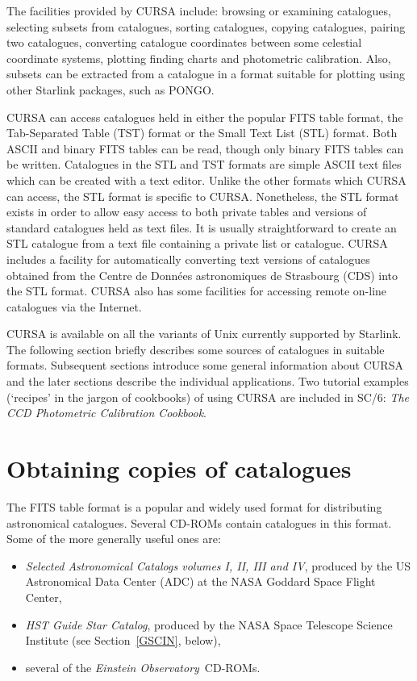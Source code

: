 \documentclass[twoside,11pt]{article}
\newcommand{\xref}[3]{#1}
\newcommand{\xlabel}[1]{}
\renewcommand{\_}{\texttt{\symbol{95}}}
\begin{document}
The facilities provided by CURSA include: browsing or examining catalogues,
selecting subsets from catalogues, sorting catalogues, copying catalogues,
pairing two catalogues, converting catalogue coordinates between some
celestial coordinate systems, plotting finding charts and photometric
calibration.  Also, subsets can be extracted from a catalogue in a format
suitable for plotting using other Starlink packages, such as PONGO.

CURSA can access catalogues held in either the popular FITS table format,
the Tab-Separated Table (TST) format or the Small Text List (STL) format.
Both ASCII and binary FITS tables can be read, though only binary FITS
tables can be written.  Catalogues in the STL and TST formats are simple
ASCII text files which can be created with a text editor.  Unlike the other
formats which CURSA can access, the STL format is specific to CURSA.
Nonetheless, the STL format exists in order to allow easy access to both
private tables and versions of standard catalogues held as text files.  It
is usually straightforward to create an STL catalogue from a text file
containing a private list or catalogue.  CURSA includes a facility for
automatically converting text versions of catalogues obtained from the
Centre de Donn\'{e}es astronomiques de Strasbourg (CDS) into the STL format.
CURSA also has some facilities for accessing remote on-line catalogues via
the Internet.

CURSA is available on all the variants of Unix currently supported by
Starlink.  The following section briefly describes some sources of
catalogues in suitable formats.  Subsequent sections introduce
some general information about CURSA and the later sections describe the
individual applications.  Two tutorial examples (`recipes' in the jargon
of cookbooks) of using CURSA are included in \xref{SC/6: {\it The CCD
Photometric Calibration Cookbook}}{sc6}{}\/\cite{SC6}.


\section{\label{OBTAIN}\xlabel{OBTAIN}Obtaining copies of catalogues}

The FITS table format is a popular and widely used format for
distributing astronomical catalogues. Several CD-ROMs contain catalogues
in this format.  Some of the more generally useful ones are:

\begin{itemize}

  \item {\it Selected Astronomical Catalogs volumes I, II, III and IV},
   produced by the US Astronomical Data Center (ADC) at the NASA Goddard
   Space Flight Center,

  \item {\it HST Guide Star Catalog}, produced by the NASA Space Telescope
   Science Institute (see Section~\ref{GSCIN}, below),

  \item several of the {\it Einstein Observatory}\, CD-ROMs.

\end{itemize}
\end{document}
